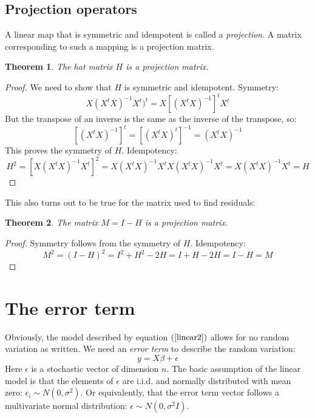 \documentclass[12pt, a4paper]{article}
\newtheorem{theorem}{Theorem}
\begin{document}
\subsection{Projection operators}
A linear map that is symmetric and idempotent is called a \textit{projection}. A matrix corresponding to such a mapping is a projection matrix.

\begin{theorem}
The hat matrix $H$ is a projection matrix.
\end{theorem}
\begin{proof}
We need to show that $H$ is symmetric and idempotent. Symmetry:
\begin{equation}
X(X^t X)^{-1}X^t)^t=X\left[(X^t X)^{-1}\right]^t X^t
\end{equation}
But the transpose of an inverse is the same as the inverse of the transpose, so:
\begin{equation}
\left[(X^t X)^{-1}\right]^t=\left[(X^t X)^t\right]^{-1}=(X^t X)^{-1}
\end{equation}
This proves the symmetry of $H$. Idempotency:
\begin{equation}
H^2=\left[X(X^t X)^{-1}X^t\right]^2=X(X^t X)^{-1}X^tX(X^t X)^{-1}X^t=X(X^t X)^{-1}X^t=H
\end{equation}
\end{proof}

This also turns out to be true for the matrix used to find residuals:

\begin{theorem}
The matrix $M=I-H$ is a projection matrix.
\end{theorem}
\begin{proof}
Symmetry follows from the symmetry of $H$. Idempotency:
\begin{equation}
M^2=(I-H)^2=I^2+H^2-2H=I+H-2H=I-H=M
\end{equation}
\end{proof}

\section{The error term}
Obviously, the model described by equation $(\ref{linear2})$ allows for no random variation as written. We need an \textit{error term} to describe the random variation:
\begin{equation}
y=X\beta + \epsilon
\end{equation}
Here $\epsilon$ is a stochastic vector of dimension $n$. The basic assumption of the linear model is that the elements of $\epsilon$ are i.i.d. and normally distributed with mean zero: $\epsilon_i\sim N(0,\sigma^2)$. Or equivalently, that the error term vector follows a multivariate normal distribution: $\epsilon\sim N(0,\sigma^2 I)$. 
\end{document}
